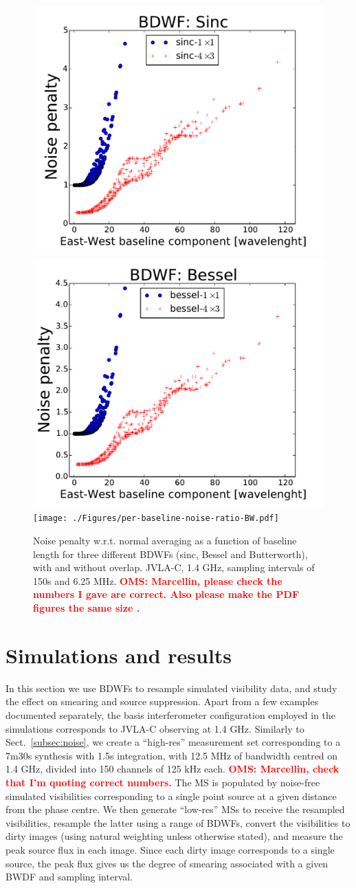 \documentclass[useAMS,usenatbib]{mn2e}
\newcommand{\OMS}[1]{\textcolor{red}{{\bf OMS: #1}}}
\begin{document}
\begin{figure}
\includegraphics[width=.33\textwidth]{./Figures/per-baseline-noise-ratio-sinc.pdf}\hfill%
\includegraphics[width=.33\textwidth]{./Figures/per-baseline-noise-ratio-bessel.pdf}\hfill%
\texttt{[image: ./Figures/per-baseline-noise-ratio-BW.pdf]}\\
\caption{Noise penalty w.r.t. normal averaging as a function of baseline length for three different BDWFs 
(sinc, Bessel and Butterworth), with and without overlap. JVLA-C, 1.4 GHz, sampling intervals of 150s and 
6.25 MHz. \OMS{Marcellin, please check the numbers I gave are correct. Also please make the PDF figures the same size
.}}
\label{fig:per-baseline-noise}
\end{figure}

\section{Simulations and results}

\newcommand{\BIN}[2]{#1s$\times$#2MHz}

In this section we use BDWFs to resample simulated visibility data, and study the effect on smearing and source 
suppression. Apart from a few examples documented separately, the basis interferometer configuration employed in 
the simulations corresponds to JVLA-C observing at 1.4 GHz. Similarly to Sect.~\ref{subsec:noise}, we create a 
``high-res'' measurement set corresponding to a 7m30s synthesis with 1.5s integration, with 12.5 MHz of bandwidth
centred on 1.4 GHz, divided into 150 channels of 125 kHz each. \OMS{Marcellin, check that I'm quoting correct 
numbers.} The MS is populated by noise-free simulated visibilities corresponding to a single point source at 
a given distance from the phase centre. We then generate ``low-res'' MSs to receive the resampled visibilities,
resample the latter using a range of BDWFs, convert the visibilities to dirty images (using natural weighting
unless otherwise stated), and measure the peak source 
flux in each image. Since each dirty image corresponds to a single source, the peak flux gives us the degree of 
smearing associated with a given BWDF and sampling interval.
\end{document}
